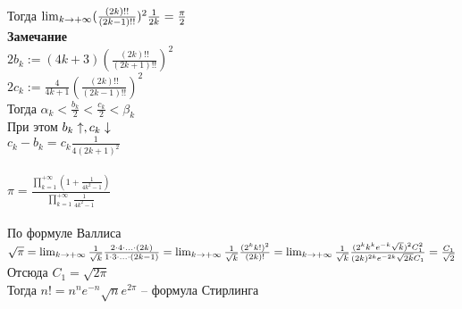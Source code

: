 \documentclass[12pt]{article}
\begin{document}
Тогда $\lim_{k\rightarrow +\infty} (\frac{(2k)!!}{(2k-1)!!})^2\frac1{2k} = \frac\pi2$\\
\textbf{Замечание}\\
$2b_k:= (4k+3)(\frac{(2k)!!}{(2k+1)!!})^2$\\
$2c_k:= \frac4{4k+1}(\frac{(2k)!!}{(2k-1)!!})^2$\\
Тогда $\alpha_k < \frac{b_k}2 < \frac{c_k}2 < \beta_k$\\
При этом $b_k \uparrow, c_k \downarrow$\\
$c_k - b_k = c_k \frac1{4(2k+1)^2}$\\\\
$\pi = \frac{\prod_{k=1}^{+\infty} (1 + \frac1{4k^2-1})}{\prod_{k=1}^{+\infty} \frac1{4k^2-1}}$\\\\
По формуле Валлиса $\sqrt \pi = \lim_{k\rightarrow + \infty} \frac1{\sqrt k}\frac{2\cdot 4 \cdot \ldots \cdot (2k)}{1\cdot 3 \cdot \ldots \cdot (2k-1)} = \lim_{k\rightarrow + \infty} \frac1{\sqrt k} \frac{(2^k k!)^2}{(2k)!} = \lim_{k\rightarrow +\infty} \frac1{\sqrt k} \frac{(2^k k^k e^{-k}\sqrt{k})^2 C_1^2}{(2k)^{2k}e^{-2k}\sqrt {2k}C_1} = \frac{C_1}{\sqrt{2}}$\\
Отсюда $C_1 =\sqrt{2\pi}$\\
Тогда $n! = n^n e^{-n}\sqrt n e^{2\pi}$ -- формула Стирлинга\\
\end{document}
